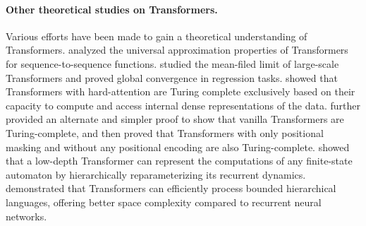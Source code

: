 \paragraph{Other theoretical studies on Transformers.} Various efforts have been made to gain a theoretical understanding of Transformers. \citet{yun2019transformers} analyzed the universal approximation properties of Transformers for sequence-to-sequence functions. \citet{li2023transformers} studied the mean-filed limit of large-scale Transformers and proved global convergence in regression tasks. 
\citet{perez2021attention} showed that Transformers with hard-attention are Turing complete exclusively based on their capacity to compute and access internal dense representations of the data. \citet{bhattamishra2020computational}
 further provided an alternate and simpler proof to show that vanilla Transformers are Turing-complete, and then proved that Transformers with only positional masking and without any positional encoding are also Turing-complete. \citet{liu2022transformers} showed that a low-depth Transformer can represent the computations of any finite-state automaton by hierarchically reparameterizing its recurrent dynamics. \citet{yao2021self} demonstrated that Transformers can efficiently process bounded hierarchical languages, offering better space complexity compared to recurrent neural networks.

 





















